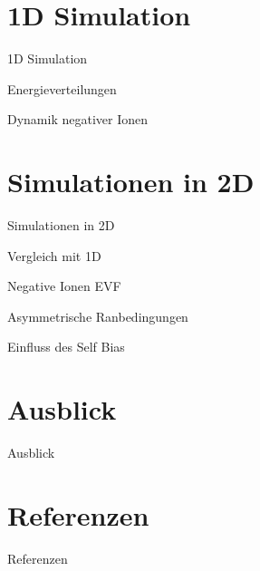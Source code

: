 \documentclass{beamer}
\begin{document}
	\section{1D Simulation}
%
		\begin{frame}{1D Simulation}
		\end{frame}
%
		\begin{frame}{Energieverteilungen}
		\end{frame}
%
%
		\begin{frame}{Dynamik negativer Ionen}
		\end{frame}
%
%
%
%
	\section{Simulationen in 2D}
%
		\begin{frame}{Simulationen in 2D}
		\end{frame}
%
		\begin{frame}{Vergleich mit 1D}
		\end{frame}
%
		\begin{frame}{Negative Ionen EVF}
		\end{frame}
%
		\begin{frame}{Asymmetrische Ranbedingungen}
		\end{frame}
%
		\begin{frame}{Einfluss des Self Bias}
		\end{frame}
%
%
%
%
	\section{Ausblick}
%
		\begin{frame}{Ausblick}
		\end{frame}
%
%
	\section{Referenzen}
%
		\begin{frame}{Referenzen}
		\end{frame}
%
%
\end{document}
